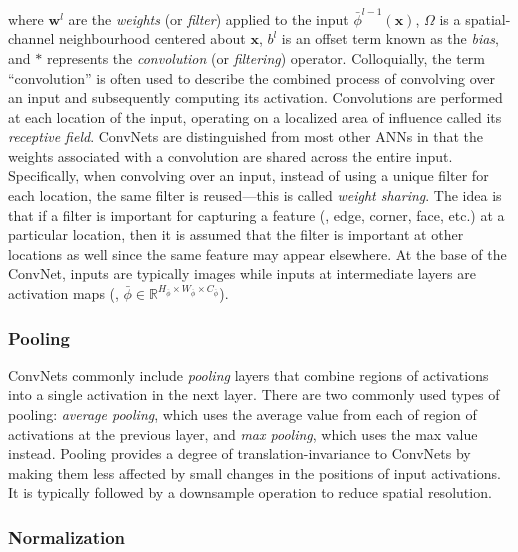 where $\mathbf{w}^l$ are the \emph{weights} (or \emph{filter}) applied to the input $\bar{\phi}^{l-1}(\mathbf{x})$, $\Omega$ is a spatial-channel neighbourhood centered about $\mathbf{x}$, $b^l$ is an offset term known as the \emph{bias}, and $\ast$ represents the \emph{convolution} (or \emph{filtering}) operator. Colloquially, the term ``convolution'' is often used to describe the combined process of convolving over an input and subsequently computing its activation. Convolutions are performed at each location of the input, operating on a localized area of influence called its \emph{receptive field}. ConvNets are distinguished from most other ANNs in that the weights associated with a convolution are shared across the entire input. Specifically, when convolving over an input, instead of using a unique filter for each location, the same filter is reused---this is called \emph{weight sharing}. The idea is that if a filter is important for capturing a feature (\eg, edge, corner, face, etc.) at a particular location, then it is assumed that the filter is important at other locations as well since the same feature may appear elsewhere.
At the base of the ConvNet, inputs are typically images while inputs at intermediate layers are activation maps (\eg, $\bar{\phi} \in \mathbb{R}^{H_{\bar{\phi}} \times W_{\bar{\phi}} \times C_{\bar{\phi}}}$). 

\subsubsection{Pooling}

ConvNets commonly include \emph{pooling} layers that combine regions of activations into a single activation in the next layer. There are two commonly used types of pooling: \emph{average pooling}, which uses the average value from each of region of activations at the previous layer, and \emph{max pooling}, which uses the max value instead. Pooling provides a degree of translation-invariance to ConvNets by making them less affected by small changes in the positions of input activations. It is typically followed by a downsample operation to reduce spatial resolution.

\subsubsection{Normalization}

